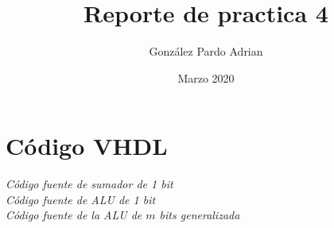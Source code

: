 \documentclass[12pt,executivepaper]{article}
\author{González Pardo Adrian}
\date{Marzo 2020}
\title{Reporte de practica 4}
\begin{document}
\maketitle
\section{Código VHDL}
\begin{center}
    
    \textit{Código fuente de sumador de 1 bit}\\
    
    \textit{Código fuente de ALU de 1 bit}\\
    
    \textit{Código fuente de la ALU de $m$ bits generalizada}
    
\end{center}
\end{document}
